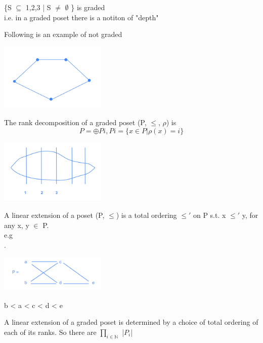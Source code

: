 \begin{example}
    \{S $\subseteq$ {1,2,3} | S $\neq$ $\emptyset$ \} is graded \\
    i.e. in a graded poset there is a notiton of "depth"
\end{example}

Following is an example of not graded
\begin{center}
        \includegraphics[width=2in]{images/Chapter 10/nonbigraded.png}
\end{center}


The rank decomposition of a graded poset (P, $\leq$, $\rho$) is
\begin{equation*}
    P = \oplus Pi, Pi = \{ x \in P | \rho(x) = i \}
\end{equation*}

\begin{center}
    \includegraphics[width=2in]{images/Chapter 10/gradedp.png}
\end{center}

A linear extension of a poset (P, $\leq$) is a total ordering $\leq'$ on P s.t. x $\leq'$ y, for any x, y $\in$ P.\\
e.g\\.
\begin{center}
        \includegraphics[width=2in]{images/Chapter 10/linear.png}
\end{center}
b < a < c < d < e\\

\begin{lemma}
    A linear extension of a graded poset is determined by a choice of total ordering of each of its ranks. So there are $\prod_{i \in \mathbb{N}}$ |$P_{i}$|\\
\end{lemma}

